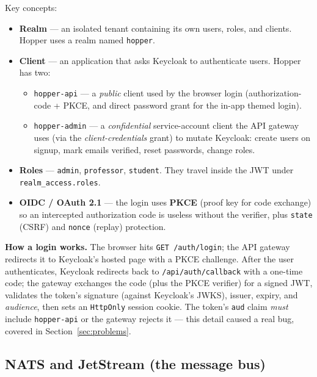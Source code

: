 \documentclass[11pt,a4paper]{article}
\newcommand{\code}[1]{\texttt{\small #1}}
\begin{document}
Key concepts:
\begin{itemize}[nosep]
  \item \textbf{Realm} --- an isolated tenant containing its own users, roles,
        and clients. Hopper uses a realm named \code{hopper}.
  \item \textbf{Client} --- an application that asks Keycloak to authenticate
        users. Hopper has two:
        \begin{itemize}[nosep]
          \item \code{hopper-api} --- a \emph{public} client used by the browser
                login (authorization-code + PKCE, and direct password grant for
                the in-app themed login).
          \item \code{hopper-admin} --- a \emph{confidential} service-account
                client the API gateway uses (via the \emph{client-credentials}
                grant) to mutate Keycloak: create users on signup, mark emails
                verified, reset passwords, change roles.
        \end{itemize}
  \item \textbf{Roles} --- \code{admin}, \code{professor}, \code{student}. They
        travel inside the JWT under \code{realm\_access.roles}.
  \item \textbf{OIDC / OAuth 2.1} --- the login uses \textbf{PKCE} (proof key for
        code exchange) so an intercepted authorization code is useless without
        the verifier, plus \code{state} (CSRF) and \code{nonce} (replay)
        protection.
\end{itemize}

\noindent
\textbf{How a login works.} The browser hits \code{GET /auth/login}; the API
gateway redirects it to Keycloak's hosted page with a PKCE challenge. After the
user authenticates, Keycloak redirects back to
\code{/api/auth/callback} with a one-time code; the gateway exchanges the code
(plus the PKCE verifier) for a signed JWT, validates the token's signature
(against Keycloak's JWKS), issuer, expiry, and \emph{audience}, then sets an
\code{HttpOnly} session cookie. The token's \code{aud} claim \emph{must} include
\code{hopper-api} or the gateway rejects it --- this detail caused a real bug,
covered in Section~\ref{sec:problems}.

\subsection{NATS and JetStream (the message bus)}
\end{document}
